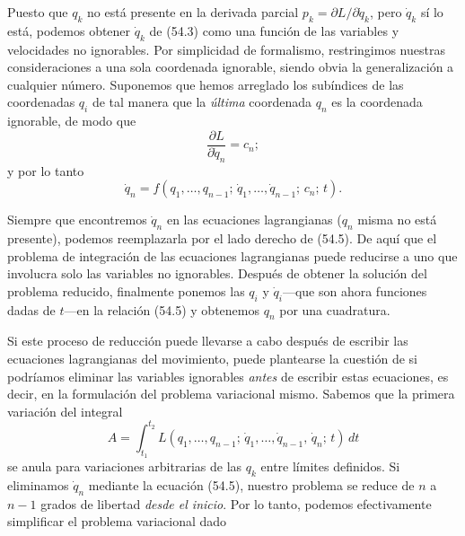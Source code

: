 \documentclass[12pt,a4paper]{book}
\begin{document}
Puesto que $q_k$ no está presente en la derivada parcial $p_k = \partial L / \partial \dot{q}_k$, pero $\dot{q}_k$ sí lo está, podemos obtener $\dot{q}_k$ de (54.3) como una función de las variables y velocidades no ignorables. Por simplicidad de formalismo, restringimos nuestras consideraciones a una sola coordenada ignorable, siendo obvia la generalización a cualquier número. Suponemos que hemos arreglado los subíndices de las coordenadas $q_i$ de tal manera que la \textit{última} coordenada $q_n$ es la coordenada ignorable, de modo que
\begin{equation}
\frac{\partial L}{\partial \dot{q}_n} = c_n; \tag{54.4}
\end{equation}
y por lo tanto
\begin{equation}
\dot{q}_n = f(q_1, \ldots, q_{n-1};\, \dot{q}_1, \ldots, \dot{q}_{n-1};\, c_n;\, t). \tag{54.5}
\end{equation}

Siempre que encontremos $\dot{q}_n$ en las ecuaciones lagrangianas ($q_n$ misma no está presente), podemos reemplazarla por el lado derecho de (54.5). De aquí que el problema de integración de las ecuaciones lagrangianas puede reducirse a uno que involucra solo las variables no ignorables. Después de obtener la solución del problema reducido, finalmente ponemos las $q_i$ y $\dot{q}_i$---que son ahora funciones dadas de $t$---en la relación (54.5) y obtenemos $q_n$ por una cuadratura.

Si este proceso de reducción puede llevarse a cabo después de escribir las ecuaciones lagrangianas del movimiento, puede plantearse la cuestión de si podríamos eliminar las variables ignorables \textit{antes} de escribir estas ecuaciones, es decir, en la formulación del problema variacional mismo. Sabemos que la primera variación del integral
\begin{equation}
A = \int_{t_1}^{t_2} L(q_1, \ldots, q_{n-1};\, \dot{q}_1, \ldots, \dot{q}_{n-1},\, \dot{q}_n;\, t) \, dt \tag{54.6}
\end{equation}
se anula para variaciones arbitrarias de las $q_k$ entre límites definidos. Si eliminamos $\dot{q}_n$ mediante la ecuación (54.5), nuestro problema se reduce de $n$ a $n-1$ grados de libertad \textit{desde el inicio}. Por lo tanto, podemos efectivamente simplificar el problema variacional dado

\end{document}
